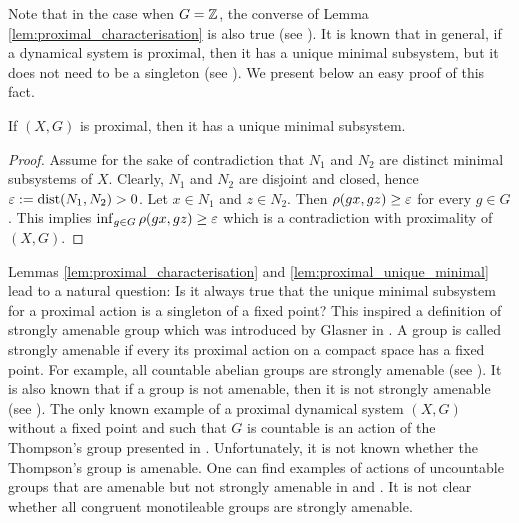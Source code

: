 \noindent
Note that in the case when $G=\mathbb{Z}$, the converse of Lemma \ref{lem:proximal_characterisation} is also true (see \cite{AK03}). It is known that in general, if a dynamical system is proximal, then it has a unique minimal subsystem, but it does not need to be a singleton (see \cite{deVries93}). We present below an easy proof of this fact.

\begin{lem}\label{lem:proximal_unique_minimal}
If $(X,G)$ is proximal, then it has a unique minimal subsystem.
\end{lem}

\begin{proof}
Assume for the sake of contradiction that $N_1$ and $N_2$ are distinct minimal subsystems of $X$. Clearly, $N_1$ and $N_2$ are disjoint and closed, hence $\varepsilon:=\operatorname{dist}(N_1,N_2)>0$. Let $x\in N_1$ and $z\in N_2$. Then $\rho(gx,gz)\geq \varepsilon$ for every $g\in G$. This implies $\inf_{g\in G}\rho(gx,gz)\geq \varepsilon$ which is a contradiction with proximality of $(X,G)$.
\end{proof} 

\noindent
Lemmas \ref{lem:proximal_characterisation} and \ref{lem:proximal_unique_minimal} lead to a natural question: Is it always true that the unique minimal subsystem for a proximal action is a singleton of a fixed point?
This inspired a definition of strongly amenable group which was introduced by Glasner in \cite{Glasner76}. A group is called strongly amenable if every its proximal action on a compact space has a fixed point. For example, all countable abelian groups are strongly amenable (see \cite{Glasner76}). It is also known that if a group is not amenable, then it is not strongly amenable (see \cite{Glasner76}). The only known example of a proximal dynamical system $(X,G)$ without a fixed point and such that $G$ is countable is an action of the Thompson's group presented in \cite{HJTV19}. Unfortunately, it is not known whether the Thompson's group is amenable. One can find examples of actions of uncountable groups that are amenable but not strongly amenable in \cite{GW02} and \cite{Glasner83}. It is not clear whether all congruent monotileable groups are strongly amenable.


